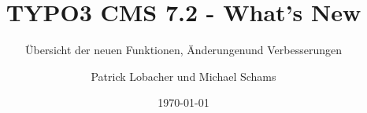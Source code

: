 %

%
%

\documentclass[t]{beamer}

\beamertemplatenavigationsymbolsempty

{
	\usetheme{typo3slides}
}

\title{TYPO3 CMS 7.2 - What's New}
\subtitle{Übersicht der neuen Funktionen, Änderungen\newline und Verbesserungen}
\author{
	\centerline{Patrick Lobacher und Michael Schams}
}

\date{\today}



\sharefont


\begingroup
	[default]
	\begin{frame}
		\titlepage
	\end{frame}
\endgroup


\section*{TYPO3 CMS 7.2 - What's New}
\begin{frame}[fragile]
	\frametitle{Kapitelübersicht}
	\framesubtitle{Kapitelübersicht}

	\begin{multicols}{2}
		\tableofcontents
	\end{multicols}

\end{frame}

